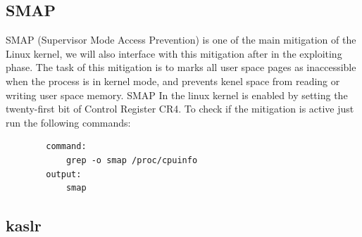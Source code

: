 \documentclass{report}
\begin{document}
    \subsection{SMAP}

    SMAP (Supervisor Mode Access Prevention) is one of the main mitigation of the Linux kernel, we will also interface with this mitigation after in the exploiting phase.\newline
    The task of this mitigation is to marks all user space pages as inaccessible when the process is in kernel mode, and prevents kenel space from reading or writing user space memory.\newline
    SMAP In the linux kernel is enabled by setting the twenty-first bit of Control Register CR4.\newline
    To check if the mitigation is active just run the following commands: \newline
      \begin{verbatim}
        command:
            grep -o smap /proc/cpuinfo
        output: 
            smap
    \end{verbatim}
    \subsection{kaslr}
\end{document}
